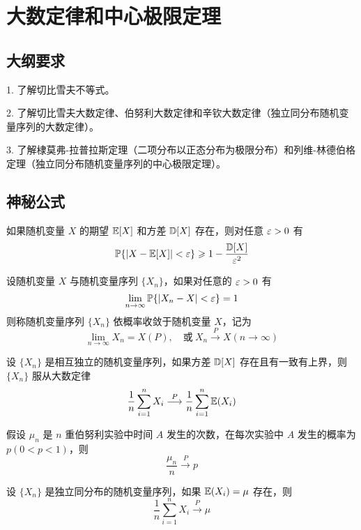 \section{大数定律和中心极限定理}

\subsection{大纲要求}

1. 了解切比雪夫不等式。

2. 了解切比雪夫大数定律、伯努利大数定律和辛钦大数定律（独立同分布随机变量序列的大数定律）。

3. 了解棣莫弗-拉普拉斯定理（二项分布以正态分布为极限分布）和列维-林德伯格定理（独立同分布随机变量序列的中心极限定理）。

\subsection{神秘公式}

\begin{theorem}[切比雪夫不等式]
	如果随机变量 $X$ 的期望 $\mathbb{E} [X]$ 和方差 $\mathbb{D} [X]$ 存在，则对任意 $\varepsilon > 0$ 有
	\[ \mathbb{P}\{|X - \mathbb{E} [X]| < \varepsilon\} \geqslant 1 - \frac{\mathbb{D} [X]}{\varepsilon^2} \]
\end{theorem}

设随机变量 $X$ 与随机变量序列 $\{X_n\}$，如果对任意的 $\varepsilon > 0$ 有
\[ \lim_{n \to \infty} \mathbb{P}\{|X_n - X| < \varepsilon \} =1 \]
则称随机变量序列 $\{X_n\}$ 依概率收敛于随机变量 $X$，记为
\[ \lim_{n \to \infty} X_n = X(P), \quad \text{或}\ X_n \stackrel{P}{\longrightarrow} X(n \to \infty) \]

\begin{theorem}[切比雪夫大数定律]
	设 $\{X_n\}$ 是相互独立的随机变量序列，如果方差 $\mathbb{D} [X]$ 存在且有一致有上界，则 $\{X_n\}$ 服从大数定律
	\[ \frac{1}{n} \sum_{i=1}^n X_i \stackrel{P}{\longrightarrow} \frac{1}{n} \sum_{i=1}^n \mathbb{E}(X_i) \]
\end{theorem}

\begin{theorem}[伯努利大数定律]
	假设 $\mu_n$ 是 $n$ 重伯努利实验中时间 $A$ 发生的次数，在每次实验中 $A$ 发生的概率为 $p(0 < p < 1)$，则
	\[ \frac{\mu_n}{n} \stackrel{P}{\longrightarrow} p \]
\end{theorem}

\begin{theorem}[辛钦大数定律]
	设 $\{X_n\}$ 是独立同分布的随机变量序列，如果 $\mathbb{E}(X_i) = \mu$ 存在，则
	\[ \frac{1}{n} \sum_{i=1}^n X_i \stackrel{P}{\longrightarrow} \mu \]
\end{theorem}


